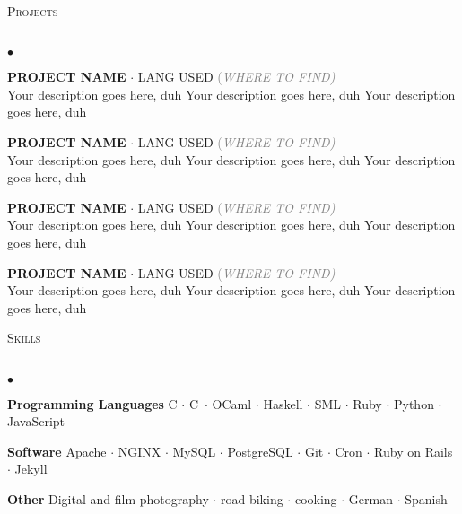 \documentclass[12pt]{article}
\newcommand{\lineunder}{\vspace*{-8pt} \\ \hspace*{-18pt} \hrulefill \\}
\newcommand{\header}[1]{
  {\hspace*{-15pt}\vspace*{6pt} \textsc{#1}} \vspace*{-6pt} \lineunder
}
\newcommand{\fillpullright}[1]{\hfill \hfill \textcolor{Gray}{(#1)}}
\newenvironment{achievements}{
  \begin{list}{$\bullet$}{\topsep 0pt \itemsep -4pt}
}{
  \vspace*{2pt}\end{list}
}
\def\cpp{{C\nolinebreak[4]\hspace{-.05em}\raisebox{.4ex}{\tiny\bf ++}}}
\def\lildot{$\cdot$ }
\begin{document}
\header{Projects}
        \begin{achievements}
        \item {\bf PROJECT NAME} \lildot LANG USED
            \fillpullright {\it WHERE TO FIND} \\
            Your description goes here, duh 
            Your description goes here, duh 
            Your description goes here, duh 
        \item {\bf PROJECT NAME} \lildot LANG USED
            \fillpullright {\it WHERE TO FIND} \\
            Your description goes here, duh 
            Your description goes here, duh 
            Your description goes here, duh 
        \item {\bf PROJECT NAME} \lildot LANG USED
            \fillpullright {\it WHERE TO FIND} \\
            Your description goes here, duh 
            Your description goes here, duh 
            Your description goes here, duh 
        \item {\bf PROJECT NAME} \lildot LANG USED
            \fillpullright {\it WHERE TO FIND} \\
            Your description goes here, duh 
            Your description goes here, duh 
            Your description goes here, duh 
        \end{achievements}

\header{Skills}
        \begin{achievements}
        \item {\bf Programming Languages} C \lildot \cpp\ \lildot OCaml \lildot
            Haskell \lildot SML \lildot Ruby \lildot Python \lildot JavaScript
        \item {\bf Software} Apache \lildot NGINX \lildot MySQL \lildot
            PostgreSQL \lildot Git \lildot Cron \lildot Ruby on Rails \lildot
            Jekyll
        \item {\bf Other} Digital and film photography \lildot road biking
            \lildot cooking \lildot German \lildot Spanish
        \end{achievements}
\end{document}
